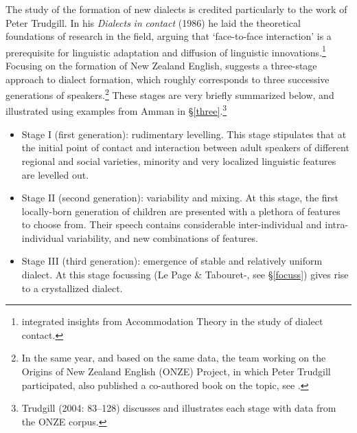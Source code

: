 \documentclass[output=paper]{langsci/langscibook}
\begin{document}
The study of the formation of new dialects is credited particularly to the work of Peter Trudgill. In his \textit{Dialects} \textit{in} \textit{contact} (1986) he laid the theoretical foundations of research in the field, arguing that ‘face-to-face interaction’ is a prerequisite for linguistic adaptation and diffusion of linguistic innovations.\footnote{\citet{Trudgill1986} integrated insights from Accommodation Theory \citep{Giles1973} in the study of dialect contact.} Focusing on the formation of New Zealand English, \citet{Trudgill2004} suggests a three-stage approach to dialect formation, which roughly corresponds to three successive generations of speakers.\footnote{In the same year, and based on the same data, the team working on the Origins of New Zealand English (ONZE) Project, in which Peter Trudgill participated, also published a co-authored book on the topic, see \citet{GordonEtAl2004}.} These stages are very briefly summarized below, and illustrated using examples from Amman in §\ref{three}.\footnote{Trudgill (2004: 83–128) discusses and illustrates each stage with data from the ONZE corpus.}

\begin{itemize}
    \item 
Stage I (first generation): rudimentary levelling. This stage stipulates that at the initial point of contact and interaction between adult speakers of different regional and social varieties, minority and very localized linguistic features are levelled out.

\item 
Stage II (second generation): variability and mixing. At this stage, the first locally-born generation of children are presented with a plethora of features to choose from. Their speech contains considerable inter-individual and intra-individual variability, and new combinations of features.

\item 
Stage III (third generation): emergence of stable and relatively uniform dialect. At this stage focussing (Le Page \& Tabouret-\citealt{Keller1985}, see §\ref{focuss}) gives rise to a crystallized dialect. 
\end{itemize}
\end{document}
